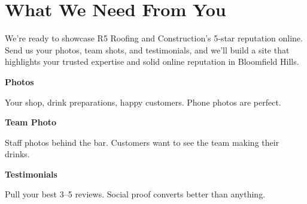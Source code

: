 \documentclass[11pt,letterpaper]{article}
\begin{document}
\vspace{0.2em}

\section*{What We Need From You}

We’re ready to showcase R5 Roofing and Construction’s 5‑star reputation online. Send us your photos, team shots, and testimonials, and we’ll build a site that highlights your trusted expertise and solid online reputation in Bloomfield Hills.

\vspace{0.12em}

\noindent\begin{minipage}[t]{0.48\textwidth}
\begin{tcolorbox}[colframe=accent-teal, boxrule=1pt, left=0.7em, right=0.7em, top=0.5em, bottom=0.5em, arc=4pt, boxsep=0pt]
{\bfseries\small\color{accent-teal}Photos}

\vspace{0.15em}

{\small Your shop, drink preparations, happy customers. Phone photos are perfect.}
\end{tcolorbox}

\vspace{0.1em}

\begin{tcolorbox}[colframe=accent-teal, boxrule=1pt, left=0.7em, right=0.7em, top=0.5em, bottom=0.5em, arc=4pt, boxsep=0pt]
{\bfseries\small\color{accent-teal}Team Photo}

\vspace{0.15em}

{\small Staff photos behind the bar. Customers want to see the team making their drinks.}
\end{tcolorbox}

\vspace{0.1em}

\begin{tcolorbox}[colframe=accent-teal, boxrule=1pt, left=0.7em, right=0.7em, top=0.5em, bottom=0.5em, arc=4pt, boxsep=0pt]
{\bfseries\small\color{accent-teal}Testimonials}

\vspace{0.15em}

{\small Pull your best 3--5 reviews. Social proof converts better than anything.}
\end{tcolorbox}
\end{minipage}
\hfill
\end{document}
